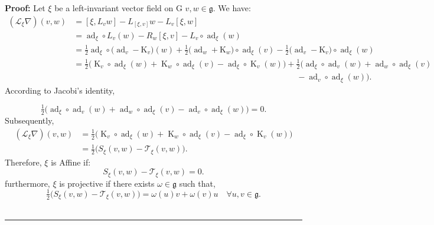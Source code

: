 \documentclass[10pt,a4paper]{amsart}
\newenvironment{proof}[1][Proof]{\textbf{#1:} }{\ \rule{0.5em}{0.5em}}
\begin{document}
\begin{proof}
Let $\xi$ be a left-invariant vector field on $\mathrm{G}$ $v, w\in \mathfrak{g}$. We have:
\begin{align} 
(\mathscr{L}_\xi \nabla)(v, w)
&= [\xi,L_v w]-L_{[\xi,v]}w-L_v[\xi,w]\nonumber\\
&= \operatorname{ad}_\xi\circ L_v(w)-R_w{[\xi,v]}-L_v\circ \operatorname{ad}_\xi(w)\nonumber\\
&=\tfrac{1}{2}\operatorname{ad}_\xi\circ \big(\operatorname{ad}_v - \mathrm{K}_v \big)(w)+\tfrac{1}{2}\big( \operatorname{ad}_w+ \mathrm{K}_w\big)\circ \operatorname{ad}_\xi(v)-\tfrac{1}{2}\big(\operatorname{ad}_v - \mathrm{K}_v)\circ \operatorname{ad}_\xi(w)\nonumber\\
&=\tfrac{1}{2} \big(\operatorname{K}_v\circ \operatorname{ad}_\xi (w)+ \operatorname{K}_w\circ \operatorname{ad}_\xi (v)-\operatorname{ad}_\xi\circ \operatorname{K}_v(w) \big)+\tfrac{1}{2} \big(\operatorname{ad}_\xi\circ \operatorname{ad}_v(w)+\operatorname{ad}_w\circ \operatorname{ad}_\xi(v)\nonumber\\
&\qquad\qquad\qquad\qquad\qquad\qquad\qquad\qquad\qquad\qquad\qquad\qquad\quad\qquad-\operatorname{ad}_v\circ \operatorname{ad}_\xi(w)\big).\label{7}
\end{align}
According to Jacobi's identity,

$$\tfrac{1}{2} \big(\operatorname{ad}_\xi\circ \operatorname{ad}_v(w)+\operatorname{ad}_w\circ \operatorname{ad}_\xi(v)-\operatorname{ad}_v\circ \operatorname{ad}_\xi(w)\big)=0.$$
Subsequently, \begin{align}
(\mathscr{L}_\xi \nabla)(v, w) &= \tfrac{1}{2} \big(\operatorname{K}_v\circ \operatorname{ad}_\xi (w)+ \operatorname{K}_w\circ \operatorname{ad}_\xi (v)-\operatorname{ad}_\xi\circ \operatorname{K}_v(w) \big)\nonumber\\
&=\tfrac12\big(S_\xi(v,w)-\mathscr{T}_\xi(v,w)\big).\label{8}
\end{align}
Therefore, $\xi$ is Affine if: \begin{equation*}
S_\xi(v,w)-\mathscr{T}_\xi(v,w)=0.
\end{equation*}
furthermore, $\xi$ is projective if there exists $\omega\in\mathfrak{g}$ such that, \begin{equation}
   \tfrac12\big(S_\xi(v,w)-\mathscr{T}_\xi(v,w)\big)=\omega(u)v+\omega(v)u\quad \forall u,v\in \mathfrak{g}. 
\end{equation}
\end{proof}
\end{document}
